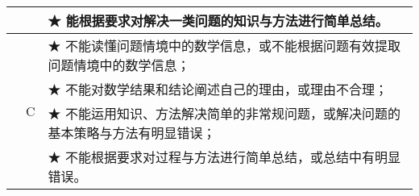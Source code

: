 \begin{itshape}
\begin{longtable}{|c|c|p{12cm}|}
   & &  ★ 能根据要求对解决一类问题的知识与方法进行简单总结。 \\        
\hline
   &   \multirow{4}{*}{C}  &  ★ 不能读懂问题情境中的数学信息，或不能根据问题有效提取问题情境中的数学信息；\\  
   & &  ★ 不能对数学结果和结论阐述自己的理由，或理由不合理；\\  
   & &  ★ 不能运用知识、方法解决简单的非常规问题，或解决问题的基本策略与方法有明显错误； \\   
   & &  ★ 不能根据要求对过程与方法进行简单总结，或总结中有明显错误。 \\   
    
\hline 
\end{longtable}
\end{itshape}

